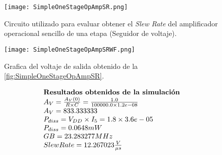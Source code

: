 \begin{figure}[ht]
	\centering
	\texttt{[image: SimpleOneStageOpAmpSR.png]}
	\caption{Circuito utilizado para evaluar obtener el \textit{Slew Rate} del amplificador operacional sencillo de una etapa (Seguidor de voltaje). \label{fig:SimpleOneStageOpAmpSR}}
\end{figure}

\begin{figure}[ht]
	\centering
	\texttt{[image: SimpleOneStageOpAmpSRWF.png]}
	\caption{Grafica del voltaje de salida obtenido de la \autoref{fig:SimpleOneStageOpAmpSR}. \label{fig:SimpleOneStageOpAmpSRWF}}
\end{figure}

\begin{equation*}
	\begin{array}{l l}
		\textbf{Resultados obtenidos de la simulación} \\
		A_{V} = \frac{A_{V}(0)}{R \times C} = \frac{ 1.0 }{ 100000.0 \times 1.2e-08 } \\
		A_{V} =  833.333333  \\
		P_{diss} = V_{DD} \times I_{5} =  1.8 \times 3.6e-05  \\
		P_{diss} =  0.0648  mW \\
		GB =  23.283277  MHz \\
		Slew Rate =  12.267023 \frac{V}{\mu s} \\
	\end{array}
\end{equation*}